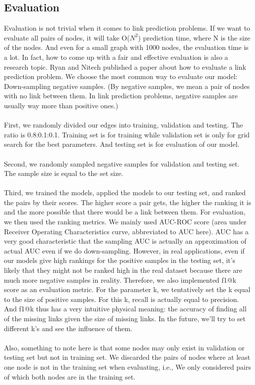 \documentclass[12pt]{article}
\begin{document}
\subsection{Evaluation}
Evaluation is not trivial when it comes to link prediction problems. If we want to evaluate all pairs of nodes, it will take O($N^2$) prediction time, where N is the size of the nodes. And even for a small graph with 1000 nodes, the evaluation time is a lot. In fact, how to come up with a fair and effective evaluation is also a research topic. Ryan and Nitech published a paper about how to evaluate a link prediction problem. We choose the most common way to evaluate our model: Down-sampling negative samples. (By negative samples, we mean a pair of nodes with no link between them. In link prediction problems, negative samples are usually way more than positive ones.)
\\
\\
First, we randomly divided our edges into training, validation and testing. The ratio is 0.8:0.1:0.1. Training set is for training while validation set is only for grid search for the best parameters. And testing set is for evaluation of our model. 
\\
\\
Second, we randomly sampled negative samples for validation and testing set. The sample size is equal to the set size.
\\
\\
Third, we trained the models, applied the models to our testing set, and ranked the pairs by their scores. The higher score a pair gets, the higher the ranking it is and the more possible that there would be a link between them. For evaluation, we then used the ranking metrics. We mainly used AUC-ROC score (area under Receiver Operating Characteristics curve, abbreviated to AUC here). AUC has a very good characteristic that the sampling AUC is actually an approximation of actual AUC even if we do down-sampling. However, in real applications, even if our models give high rankings for the positive samples in the testing set, it's likely that they might not be ranked high in the real dataset because there are much more negative samples in reality. Therefore, we also implemented f1@k score as an evaluation metric. For the parameter k, we tentatively set the k equal to the size of positive samples. For this k, recall is actually equal to precision. And f1@k thus has a very intuitive physical meaning: the accuracy of finding all of the missing links given the size of missing links. In the future, we'll try to set different k's and see the influence of them. 
\\
\\
Also, something to note here is that some nodes may only exist in validation or testing set but not in training set. We discarded the pairs of nodes where at least one node is not in the training set when evaluating, i.e., We only considered pairs of which both nodes are in the training set.
\end{document}
